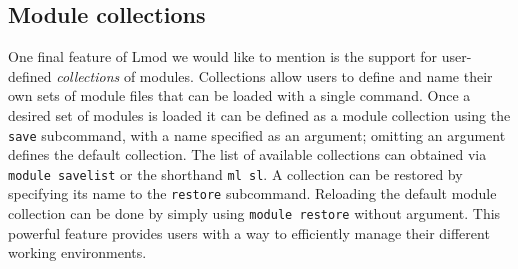 
\subsection{Module collections}

One final feature of Lmod we would like to mention is the support for user-defined
\emph{collections} of modules. Collections allow users to define and name their
own sets of module files that can be loaded with a single command. Once a desired
set of modules is loaded it can be defined as a module collection using the
\texttt{\small save} subcommand, with a name specified as an argument; omitting an
argument defines the default collection. The list of available collections
can obtained via \texttt{\small module savelist} or the shorthand
\texttt{\small ml sl}. A collection can be restored by specifying its name to the
\texttt{\small restore} subcommand. Reloading the default module collection can be
done by simply using \texttt{\small module restore} without argument.
This powerful feature provides users with a way to efficiently manage their
different working environments.



%

